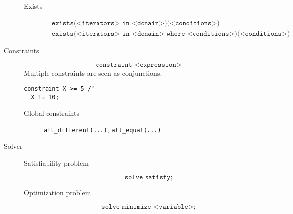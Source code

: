 \begin{description}
\begin{description}
            \item[Exists]
                \[ 
                    \begin{split}
                        &\texttt{exists(<iterators> in <domain>)}\texttt{(<conditions>) } \\
                        &\texttt{exists(<iterators> in <domain> where <conditions>)}\texttt{(<conditions>) }
                    \end{split}
                \]
        \end{description}

    \item[Constraints] 
        \[ \texttt{constraint <expression>} \]
        Multiple constraints are seen as conjunctions.

        \begin{example}
            \texttt{constraint X >= 5 /\char`\\\, X != 10;}
        \end{example}

        \begin{description}
            \item[Global constraints] \texttt{all\_different(...)}, \texttt{all\_equal(...)} 
        \end{description}

    \item[Solver]  \phantom{}
        \begin{description}
            \item[Satisfiability problem] 
                \[ \texttt{solve satisfy;} \]
            \item[Optimization problem] 
                \[ \texttt{solve minimize <variable>;} \]
        \end{description}
\end{description}